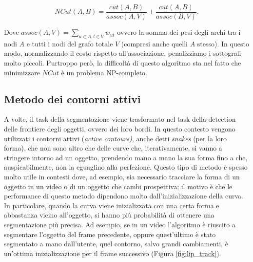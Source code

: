 \begin{equation}
    NCut(A,B) = \frac{cut(A,B)}{assoc(A,V)} + \frac{cut(A,B)}{assoc(B,V)}.
\end{equation}

Dove $assoc(A,V)= \sum_{u \in A, t \in V}{w_{ut}}$ ovvero la somma dei pesi degli archi tra i nodi $A$ e tutti i nodi del grafo totale $V$ (compresi anche quelli $A$ stesso). In questo modo, normalizzando il costo rispetto all'associazione, penalizziamo i sottografi molto piccoli. Purtroppo però, la difficoltà di questo algoritmo sta nel fatto che minimizzare $NCut$ è un problema NP-completo.











\subsection{Metodo dei contorni attivi}
\label{metodi_contorni}
A volte, il task della segmentazione viene trasformato nel task della detection delle frontiere degli oggetti, ovvero dei loro bordi. In questo contesto vengono utilizzati i contorni attivi (\textit{active contours)}, anche detti \textit{snakes} (per la loro forma), che non sono altro che delle curve che, iterativamente, si vanno a stringere intorno ad un oggetto, prendendo mano a mano la sua forma fino a che, auspicabilmente, non la eguaglino alla perfezione. Questo tipo di metodo è spesso molto utile in contesti dove, ad esempio, sia necessario tracciare la forma di un oggetto in un video o di un oggetto che cambi prospettiva; il motivo è che le performance di questo metodo dipendono molto dall'inizializzazione della curva. In particolare, quando la curva viene inizializzata con una certa forma e abbastanza vicino all'oggetto, si hanno più probabilità di ottenere una segmentazione più precisa. Ad esempio, se in un video l'algoritmo è riuscito a segmentare l'oggetto del frame precedente, oppure quest'ultimo è stato segmentato a mano dall'utente, quel contorno, salvo grandi cambiamenti, è un'ottima inizializzazione per il frame successivo (Figura \ref{fig:lip_track}).

